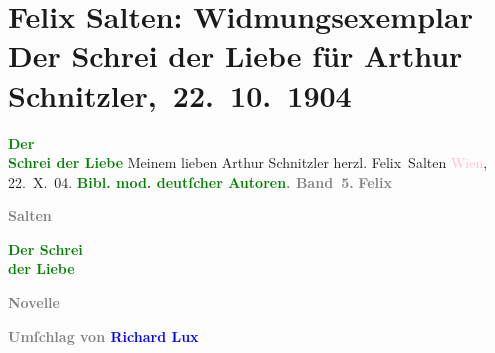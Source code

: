 

\renewcommand{\erwaehntePersonen}{Personen: Richard Lux}
\renewcommand{\erwaehnteInstitutionen}{Institutionen: Wiener Verlag}
\renewcommand{\erwaehnteOrte}{Orte: Leipzig, Wien}
\renewcommand{\erwaehnteWerke}{Werke: Bibliothek moderner deutscher Autoren, Der Schrei der Liebe. Novelle}
\section[ Felix Salten: Widmungsexemplar Der Schrei der Liebe für Arthur Schnitzler, 22. 10. 1904]{Felix Salten: Widmungsexemplar Der Schrei der Liebe für Arthur
               Schnitzler, 22. 10. 1904}
\nopagebreak{}
\rehead{ }\normalsize\beginnumbering{}
\toendnotes[C]{\smallbreak\pagebreak[2]}
\pstart
           \noindent{}\centering{}{\pb}\textcolor{gray}{\textbf{\textcolor{green}{Der {\\}Schrei der Liebe}{}\ledrightnote{\textcolor{green}{Der Schrei der Liebe. Novelle}}}}\pend
           {\bigskip}
\pstart
           \noindent{}Meinem lieben Arthur Schnitzler\pend
           \pstart herzl. \spacefill\mbox{Felix Salten}\pend{}
\pstart
           \textcolor{pink}{Wien}{}\ledrightnote{\textcolor{pink}{Wien}}, 22. X. 04.\pend
           {\bigskip}
\pstart
           \noindent{}\textcolor{gray}{\textbf{\textcolor{green}{Bibl. mod. deutſcher Autoren}{}\ledrightnote{\textcolor{green}{Bibliothek moderner deutscher Autoren}}. Band 5.}}\pend
           {\bigskip}
\pstart
           \noindent{}\centering{}{\pb}\textcolor{gray}{\textbf{Felix}}\pend
           
\pstart
           \noindent{}\centering{}\textcolor{gray}{\textbf{Salten}}\pend
           
\pstart
           \noindent{}\centering{}{\pb}\textcolor{gray}{\textbf{\textcolor{green}{Der Schrei {\\}der Liebe}{}\ledrightnote{\textcolor{green}{Der Schrei der Liebe. Novelle}}}}\pend
           
\pstart
           \noindent{}\centering{}\textcolor{gray}{\textbf{Novelle}}\pend
           
\pstart
           \noindent{}\centering{}\textcolor{gray}{\textbf{Umſchlag von \textcolor{blue}{Richard
                  Lux}{}\ledrightnote{\textcolor{blue}{Richard Lux}}}}\pend
           
